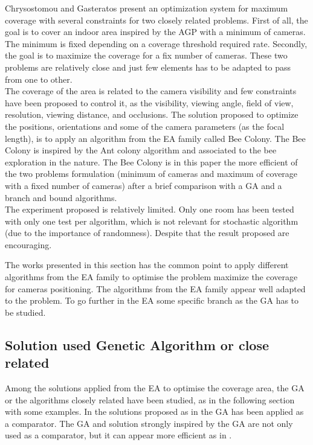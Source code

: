 Chrysostomou and Gasteratos \cite{82*chrysostomou2012} present an optimization system for maximum coverage with several constraints for two closely related problems. First of  all, the goal is to cover an indoor area inspired by the AGP with a minimum of cameras.  The minimum is fixed depending  on a coverage threshold required rate. Secondly, the goal is to maximize the coverage for a fix number of cameras. These two problems are relatively close and just few elements has to be adapted to pass from one to other.\\
The coverage of the area is related to the camera visibility and few constraints have been proposed to control it, as the visibility, viewing angle, field of view, resolution, viewing distance, and occlusions. The solution proposed to optimize the positions, orientations and some of the camera parameters (as the focal length), is to apply an algorithm from the EA family called Bee Colony. The Bee Colony is inspired by the Ant colony algorithm and associated to the bee exploration in the nature. The Bee Colony is in this paper \cite{82*chrysostomou2012} the more efficient of the two problems formulation (minimum of cameras and maximum of coverage with a fixed number of cameras) after a brief comparison with a GA and a branch and bound algorithms. \\
The experiment proposed is relatively limited. Only one room has been tested with only one test per algorithm, which is not relevant for stochastic algorithm (due to the importance of randomness). Despite that the result proposed are encouraging. 

The works presented in this section has the common point to apply different algorithms from the EA family to optimise the problem maximize the coverage for cameras positioning. The algorithms from the EA family appear well adapted to the problem. To go further in the EA some specific branch as the GA has to be studied.

\subsection{Solution used Genetic Algorithm or close related}

 Among the solutions applied from the EA to optimise the coverage area, the GA or the algorithms closely related have been studied, as in the following section with some examples.
 In the solutions proposed as in \cite{82*chrysostomou2012,33*reddy2012,141*akbarzadeh2013} the GA has been applied as a comparator. The GA and solution strongly inspired by the GA  are not only used as a comparator, but it can appear more efficient as in \cite{83*van2009,101*topcuoglu2009,165*jiang2010,152*wang2009}.


